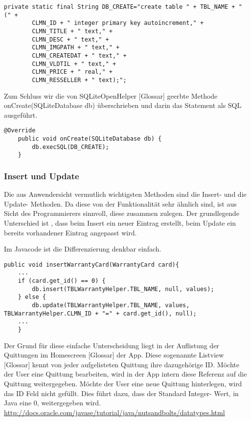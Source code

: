 \begin{lstlisting}[caption=Tabellen Creation Statement,captionpos=b,lang=java]
	private static final String DB_CREATE="create table " + TBL_NAME + " (" +
		CLMN_ID + " integer primary key autoincrement," + 
		CLMN_TITLE + " text," + 
		CLMN_DESC + " text," + 
		CLMN_IMGPATH + " text," + 
		CLMN_CREATEDAT + " text," +
		CLMN_VLDTIL + " text," +
		CLMN_PRICE + " real," +
		CLMN_RESSELLER + " text);";
\end{lstlisting}

Zum Schluss wir die von SQLiteOpenHelper [Glossar] geerbte Methode onCreate(SQLiteDatabase db) überschrieben und darin das Statement als SQL ausgeführt.
\begin{lstlisting}[caption=SQL Statement,captionpos=b,lang=java]
	@Override
	public void onCreate(SQLiteDatabase db) {
		db.execSQL(DB_CREATE);
	}
\end{lstlisting}

\subsubsection{Insert und Update}
Die aus Anwendersicht vermutlich wichtigsten Methoden sind die Insert- und die Update- Methoden. Da diese von der Funktionalität sehr ähnlich sind, ist aus Sicht des Programmierers sinnvoll, diese zusammen zulegen. Der grundlegende Unterschied ist , dass beim Insert ein neuer Eintrag erstellt, beim Update ein bereits vorhandener Eintrag angepasst wird.

Im Javacode ist die Differenzierung denkbar einfach.
\begin{lstlisting}[caption=Tabellen Creation Statement,captionpos=b,lang=java]
public void insertWarrantyCard(WarrantyCard card){
	...
	if (card.get_id() == 0) {
		db.insert(TBLWarrantyHelper.TBL_NAME, null, values);
	} else {
		db.update(TBLWarrantyHelper.TBL_NAME, values, TBLWarrantyHelper.CLMN_ID + "=" + card.get_id(), null);
	...
	}
\end{lstlisting}
Der Grund für diese einfache Unterscheidung liegt in der Auflistung der Quittungen im Homescreen [Glossar] der App. Diese sogenannte Listview [Glossar] kennt von jeder aufgelisteten Quittung ihre dazugehörige ID. Möchte der User eine Quittung bearbeiten, wird in der App intern diese Referenz auf die Quittung weitergegeben. Möchte der User eine neue Quittung hinterlegen, wird das ID Feld nicht gefüllt. Dies führt dazu, dass der Standard Integer- Wert, in Java eine 0, weitergegeben wird. \url{http://docs.oracle.com/javase/tutorial/java/nutsandbolts/datatypes.html}


